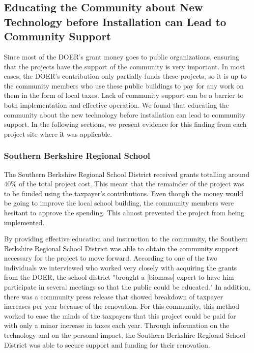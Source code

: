 \subsection{Educating the Community about New Technology before Installation can Lead to Community Support}
\par Since most of the DOER’s grant money goes to public organizations, ensuring that the projects have the support of the community is very important. In most cases, the DOER’s contribution only partially funds these projects, so it is up to the community members who use these public buildings to pay for any work on them in the form of local taxes. Lack of community support can be a barrier to both implementation and effective operation. We found that educating the community about the new technology before installation can lead to community support. In the following sections, we present evidence for this finding from each project site where it was applicable.

\subsubsection{Southern Berkshire Regional School}
\par The Southern Berkshire Regional School District received grants totalling around 40\% of the total project cost. This meant that the remainder of the project was to be funded using the taxpayer’s contributions. Even though the money would be going to improve the local school building, the community members were hesitant to approve the spending. This almost prevented the project from being implemented.
\par By providing effective education and instruction to the community, the Southern Berkshire Regional School District was able to obtain the community support necessary for the project to move forward. According to one of the two individuals we interviewed who worked very closely with acquiring the grants from the DOER, the school district "brought a [biomass] expert to have him participate in several meetings so that the public could be educated." In addition, there was a community press release that showed breakdown of taxpayer increases per year because of the renovation. For this community, this method worked to ease the minds of the taxpayers that this project could be paid for with only a minor increase in taxes each year. Through information on the technology and on the personal impact, the Southern Berkshire Regional School District was able to secure support and funding for their renovation.

